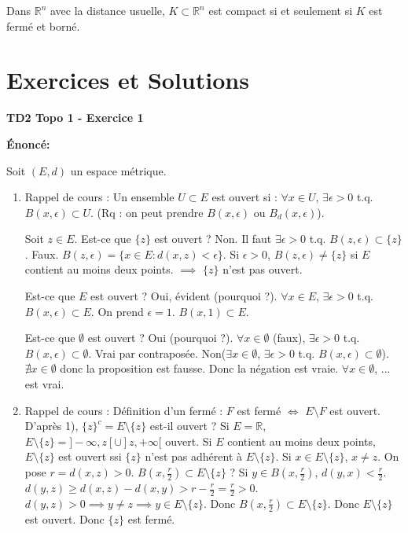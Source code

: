 \documentclass[oneside]{book}
\begin{document}
\begin{theorem}
Dans $\mathbb{R}^n$ avec la distance usuelle, $K \subset \mathbb{R}^n$ est compact si et seulement si $K$ est fermé et borné.
\end{theorem}

\section{Exercices et Solutions}

\textbf{TD2 Topo 1 - Exercice 1}

\textbf{Énoncé:}

Soit $(E, d)$ un espace métrique.

\begin{enumerate}
    \item  Rappel de cours : Un ensemble $U \subset E$ est ouvert si :
    $\forall x \in U$, $\exists \epsilon > 0$ t.q. $B(x, \epsilon) \subset U$.
    (Rq : on peut prendre $B(x, \epsilon)$ ou $B_d(x, \epsilon)$).

    Soit $z \in E$. Est-ce que $\{z\}$ est ouvert ?
    Non. Il faut $\exists \epsilon > 0$ t.q. $B(z, \epsilon) \subset \{z\}$.
    Faux. $B(z, \epsilon) = \{x \in E : d(x, z) < \epsilon\}$.
    Si $\epsilon > 0$, $B(z, \epsilon) \neq \{z\}$ si $E$ contient au moins deux points.
    $\implies$ $\{z\}$ n'est pas ouvert.

    Est-ce que $E$ est ouvert ? Oui, évident (pourquoi ?).
    $\forall x \in E$, $\exists \epsilon > 0$ t.q. $B(x, \epsilon) \subset E$. On prend $\epsilon = 1$. $B(x, 1) \subset E$.

    Est-ce que $\emptyset$ est ouvert ? Oui (pourquoi ?).
    $\forall x \in \emptyset$ (faux), $\exists \epsilon > 0$ t.q. $B(x, \epsilon) \subset \emptyset$.
    Vrai par contraposée.
    Non($\exists x \in \emptyset$, $\exists \epsilon > 0$ t.q. $B(x, \epsilon) \subset \emptyset$).
    $\nexists x \in \emptyset$ donc la proposition est fausse.
    Donc la négation est vraie.
    $\forall x \in \emptyset$, ... est vrai.

    \item  Rappel de cours : Définition d'un fermé : $F$ est fermé $\iff$ $E \setminus F$ est ouvert.
    D'après 1), $\{z\}^c = E \setminus \{z\}$ est-il ouvert ?
    Si $E = \mathbb{R}$, $E \setminus \{z\} = ]-\infty, z[ \cup ]z, +\infty[$ ouvert.
    Si $E$ contient au moins deux points, $E \setminus \{z\}$ est ouvert ssi $\{z\}$ n'est pas adhérent à $E \setminus \{z\}$.
    Si $x \in E \setminus \{z\}$, $x \neq z$. On pose $r = d(x, z) > 0$.
    $B(x, \frac{r}{2}) \subset E \setminus \{z\}$ ?
    Si $y \in B(x, \frac{r}{2})$, $d(y, x) < \frac{r}{2}$.
    $d(y, z) \geq d(x, z) - d(x, y) > r - \frac{r}{2} = \frac{r}{2} > 0$.
    $d(y, z) > 0 \implies y \neq z \implies y \in E \setminus \{z\}$.
    Donc $B(x, \frac{r}{2}) \subset E \setminus \{z\}$.
    Donc $E \setminus \{z\}$ est ouvert.
    Donc $\{z\}$ est fermé.


\end{enumerate}
\end{document}
